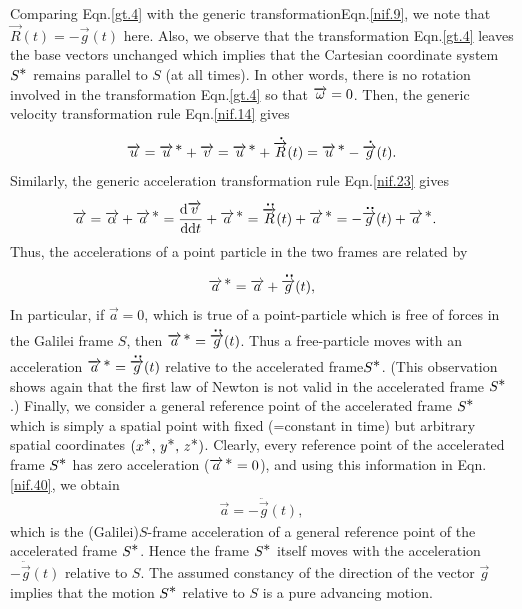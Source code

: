 Comparing Eqn.\eqref{gt.4} with the generic 
transformation\break Eqn.\eqref{nif.9}, we note that 
$\vec{R}(t)=-\vec{g}(t)$ here. Also, we observe that 
the transformation Eqn.\eqref{gt.4} leaves the base 
vectors unchanged which implies that the Cartesian 
coordinate system $ S^{\textstyle \ast}$ remains parallel to $S$ (at 
all times). In other words, there is no rotation 
involved in the transformation Eqn.\eqref{gt.4} so that 
$\overrightarrow{{\omega}}=0$. Then, the generic velocity 
transformation rule Eqn.\eqref{nif.14} gives 
\begin{align}
\overrightarrow{u}= {\overrightarrow{u}^{\,{\textstyle \ast}}}+\overrightarrow{v}={\overrightarrow{u}^{\,{\textstyle \ast}}}
+{\overset{\hspace*{1.5pt}\centerdot}{\overrightarrow{R}} }(t)={\overrightarrow{u}^{\,{\textstyle \ast}}}-{\overset{\hspace*{1.5pt}\centerdot}{\overrightarrow{g}} }(t).
\end{align}
Similarly, the generic acceleration transformation rule  
Eqn.\eqref{nif.23} gives 
\begin{align} 
\overrightarrow{a}&= \overrightarrow{\alpha}+{\overrightarrow{a}^{\,{\textstyle \ast}}}=\frac{\mathrm{d}{\overrightarrow{v}}}{\mathrm{d}{\mathrm{d} 
t}}+{\overrightarrow{a}^{\,{\textstyle \ast}}} 
=\overset{\hspace*{1.5pt}\centerdot\hspace{ 1pt}\centerdot }{\overrightarrow{R}}(t)+{\overrightarrow{a}^{\,{\textstyle \ast}}}=-\overset{\hspace*{1.5pt}\centerdot\hspace{ 1pt}\centerdot }{\overrightarrow{g}}(t) 
+{\overrightarrow{a}^{\,{\textstyle \ast}}}. 
\end{align} 
Thus, the accelerations of a point particle in the two 
frames are related by
\begin{align}\label{nif.40}
{\overrightarrow{a}^{\,{\ensuremath{\textstyle \ast}}}}=\overrightarrow{a}+\overset{\hspace*{1.5pt}\centerdot\hspace{ 1pt}\centerdot }{\overrightarrow{g}}(t),
\end{align}
In particular, if $\vec{a}=0$, which is true of a 
point-particle which is free of forces in the Galilei 
frame $S$, then ${\overrightarrow{a}^{\,{\textstyle \ast}}}=\overset{\hspace*{1.5pt}\centerdot\hspace{ 1pt}\centerdot }{\overrightarrow{g}}(t)$. Thus {a 
free-particle moves with an acceleration 
${\overrightarrow{a}^{\,{\textstyle \ast}}}=\overset{\hspace*{1.5pt}\centerdot\hspace{ 1pt}\centerdot }{\overrightarrow{g}}(t)$ 
relative to the accelerated frame}$S^{\textstyle \ast}$. (This 
observation shows again that the first law of Newton is not 
valid in the accelerated frame $S^{\textstyle \ast}$.) Finally, we 
consider a general {reference point} of the accelerated 
frame $S^{\textstyle \ast}$ which is simply a spatial point with fixed 
(=constant in time) but arbitrary spatial coordinates 
$(x^{\textstyle \ast},\,y^{\textstyle \ast},\,z^{\textstyle \ast})$. Clearly, every reference 
point of the accelerated frame $S^{\textstyle \ast}$ has zero 
acceleration (${\overrightarrow{a}^{\,{\textstyle \ast}}}=0$), and using this information 
in Eqn.\eqref{nif.40}, we obtain
\begin{align}
\vec{a}=-\ddot{\vec{g}}(t),
\end{align}
which is the (Galilei)$S$-frame acceleration of a
{general reference point} of the accelerated frame
$S^{\textstyle \ast}$. Hence the frame $S^{\textstyle \ast}$ itself moves with the
acceleration $-\ddot{\vec{g}}(t)$ relative to $S$. The
assumed constancy of the direction of the vector $\vec{g}$
implies that the motion $S^{\textstyle \ast}$ relative to $S$ is a pure
advancing motion.

\vspace{-.3cm}

